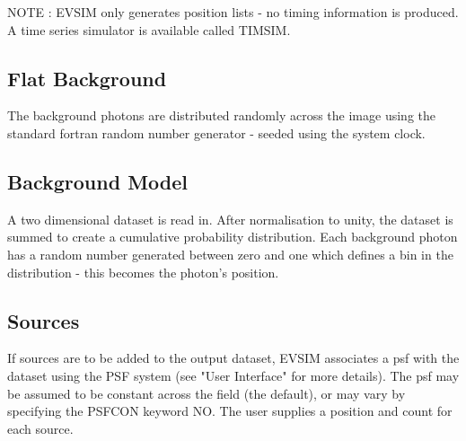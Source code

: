 \documentclass{book}
\renewcommand{\_}{{\tt\char'137}}     %
\begin{document}
NOTE : EVSIM only generates position lists - no timing information
is produced. A time series simulator is available called
TIMSIM.

\subsection{Flat Background}
The background photons are distributed randomly across the image
using the standard fortran random number generator - seeded using
the system clock.

\subsection{Background Model}
A two dimensional dataset is read in. After normalisation to unity,
the dataset is summed to create a cumulative probability distribution.
Each background photon has a random number generated between zero
and one which defines a bin in the distribution - this becomes the
photon's position.

\subsection{Sources}
If sources are to be added to the output dataset, EVSIM associates
a psf with the dataset using the PSF system (see "User Interface" for
more details). The psf may be assumed to be constant across the
field (the default), or may vary by specifying the PSFCON keyword
NO. The user supplies a position and count for each source.
\end{document}

